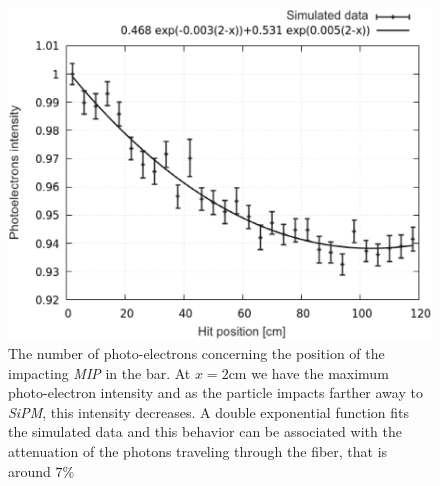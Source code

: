 \documentclass[submitting]{nst}
\begin{document}
\begin{figure}[h!]
    \centering
        \includegraphics[scale=0.41]{Figures/atenuacion_barra_2.png}
   \caption{The number of photo-electrons concerning the position of the impacting \textsl{MIP} in the bar. 
   At $x=2$cm we have the maximum photo-electron intensity and as the particle impacts farther away to \textsl{SiPM}, this intensity decreases. A double exponential function fits the simulated data and this behavior can be associated with the attenuation of the photons traveling through the fiber, that is around $7$\%}\label{atenuacion_barra}
\end{figure}
\end{document}
